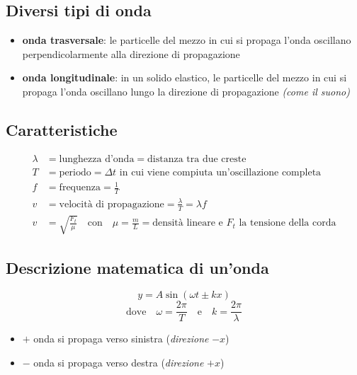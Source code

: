 \documentclass[12pt]{article}
\begin{document}
\subsection{Diversi tipi di onda}
\begin{itemize}
    \item \textbf{onda trasversale}: le particelle del mezzo in cui si propaga l'onda oscillano perpendicolarmente alla direzione di propagazione
    \item \textbf{onda longitudinale}: in un solido elastico, le particelle del mezzo in cui si propaga l'onda oscillano lungo la direzione di propagazione \textit{(come il suono)}
\end{itemize}

\subsection{Caratteristiche}
\begin{align*}
    \lambda &= \text{lunghezza d'onda} = \text{distanza tra due creste} \\
    T &= \text{periodo} = \text{$\Delta t$ in cui viene compiuta un'oscillazione completa} \\
    f &= \text{frequenza} = \frac{1}{T} \\
    v &= \text{velocità di propagazione} = \frac{\lambda}{T} = \lambda f \\
    v &= \sqrt{\frac{F_t}{\mu}} \hspace{1em} \text{con} \hspace{1em} \mu = \frac{m}{L} = \text{densità lineare e $F_t$ la tensione della corda}
\end{align*}

\subsection{Descrizione matematica di un'onda}
$$ y = A \sin{\left(\omega t \pm kx\right)} $$
$$ \text{dove} \hspace{1em} \omega = \frac{2\pi}{T} \hspace{1em} \text{e} \hspace{1em} k = \frac{2\pi}{\lambda} $$
\begin{itemize}
    \item \textbf{$+$} onda si propaga verso sinistra (\textit{direzione} $-x$)
    \item \textbf{$-$} onda si propaga verso destra (\textit{direzione} $+x$)
\end{itemize}
\end{document}
